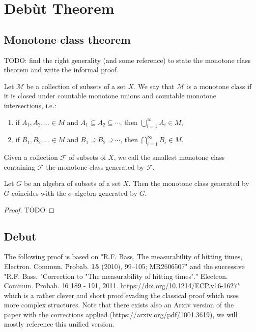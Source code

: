 \chapter{Debùt Theorem}
\label{chap:debut_theorem}

\section{Monotone class theorem}

TODO: find the right generality (and some reference) to state the monotone class theorem and write the informal proof.

\begin{definition}\label{def:monotone_class}
  Let $\mathcal{M}$ be a collection of subsets of a set $X$. We say that $\mathcal{M}$ is a monotone class if it is closed under countable monotone unions and countable monotone intersections, i.e.:
  \begin{enumerate}
    \item if \( A_1, A_2, \ldots \in M \) and \( A_1 \subseteq A_2 \subseteq \cdots \), then
    \( \bigcup_{i=1}^\infty A_i \in M \),
    \item if \( B_1, B_2, \ldots \in M \) and \( B_1 \supseteq B_2 \supseteq \cdots \), then
    \( \bigcap_{i=1}^\infty B_i \in M \).
  \end{enumerate}
  Given a collection $\mathcal{F}$ of subsets of $X$, we call the smallest monotone class containing $\mathcal{F}$ the monotone class generated by $\mathcal{F}$.
\end{definition}

\begin{theorem}\label{thm:monotone_class}
  Let \(G\) be an algebra of subsets of a set \(X\). Then the monotone class generated by \(G\) coincides with the $\sigma$-algebra generated by \(G\).
\end{theorem}

\begin{proof}
  TODO
\end{proof}

\section{Debut}
The following proof is based on "R.F. Bass, The measurability of hitting times, Electron. Commun. Probab. {\bf 15} (2010), 99--105; MR2606507"
and the successive "R.F. Bass. "Correction to "The measurability of hitting times"." Electron. Commun. Probab. 16 189 - 191, 2011. \url{https://doi.org/10.1214/ECP.v16-1627}"
which is a rather clever and short proof evading the classical proof which uses more complex structures. Note that there exists also an Arxiv version of the paper with the corrections applied (\url{https://arxiv.org/pdf/1001.3619}), we will mostly reference this unified version.


